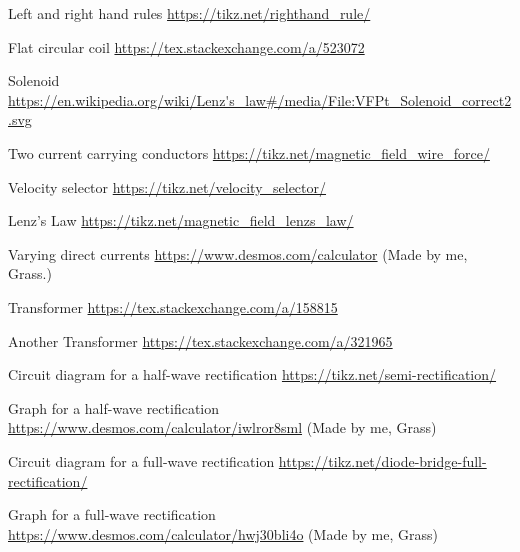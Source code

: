 \documentclass[oneside]{book}
\begin{document}
\begin{enumerate}[label={[\arabic*]}]
    \item\label{Left and right hand rules} Left and right hand rules \url{https://tikz.net/righthand_rule/}
    \item\label{Flat circular coil} Flat circular coil \url{https://tex.stackexchange.com/a/523072}
    \item\label{Solenoid} Solenoid \url{https://en.wikipedia.org/wiki/Lenz's_law#/media/File:VFPt_Solenoid_correct2.svg}
    \item\label{Two current carrying conductors} Two current carrying conductors \url{https://tikz.net/magnetic_field_wire_force/}
    \item\label{Velocity selector} Velocity selector \url{https://tikz.net/velocity_selector/}
    \item\label{Lenz's Law} Lenz's Law \url{https://tikz.net/magnetic_field_lenzs_law/}
    \item\label{Varying direct current} Varying direct currents \url{https://www.desmos.com/calculator} (Made by me, Grass.)
    \item\label{Transformer} Transformer \url{https://tex.stackexchange.com/a/158815}
    \item\label{Another Transformer} Another Transformer \url{https://tex.stackexchange.com/a/321965}
    \item\label{Half-Wave-Recification-Circuit} Circuit diagram for a half-wave rectification \url{https://tikz.net/semi-rectification/}
    \item\label{Half-Wave-Recification-Graph} Graph for a half-wave rectification \url{https://www.desmos.com/calculator/iwlror8sml} (Made by me, Grass)
    \item\label{Full-Wave-Rectificaion-Circuit} Circuit diagram for a full-wave rectification \url{https://tikz.net/diode-bridge-full-rectification/}
    \item\label{Full-Wave-Rectification-Graph} Graph for a full-wave rectification \url{https://www.desmos.com/calculator/hwj30bli4o} (Made by me, Grass)
\end{enumerate}
\end{document}
